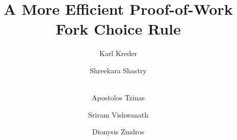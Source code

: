 \title{A More Efficient Proof-of-Work\\Fork Choice Rule}
\ifanonymous{\iflncs
\author{}\institute{}
\fi}
\else
\author{
        Karl Kreder \and
        Shreekara Shastry \and\\
        Apostolos Tzinas \and
        Sriram Vishwanath \and
        Dionysis Zindros
}
